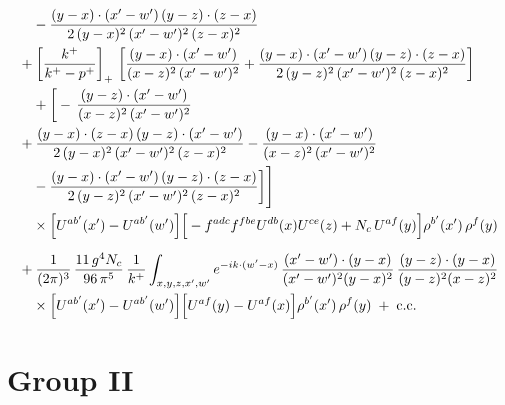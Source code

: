 \documentclass[9pt]{article}
\numberwithin{equation}{section}
\begin{document}
\begin{align}
&\quad -\frac{(y-x)\cdot (x^{\prime}-w^{\prime})\,(y-z)\cdot (z-x)}{2\,(y-x)^{2}\,(x^{\prime}-w^{\prime})^{2}\,(z-x)^{2}}\notag \\ & +\left[\frac{k^{+}}{k^{+}-p^{+}}\right]_{+}\,\left[\frac{(y-x)\cdot (x^{\prime}-w^{\prime})}{(x-z)^{2}\,(x^{\prime}-w^{\prime})^{2}}+\frac{(y-x)\cdot (x^{\prime}-w^{\prime})\,(y-z)\cdot (z-x)}{2\,(y-z)^{2}\,(x^{\prime}-w^{\prime})^{2}\,(z-x)^{2}}\right]\notag\\
&\quad +\bigg[-\,\frac{(y-z)\cdot (x^{\prime}-w^{\prime})}{(x-z)^{2}\,(x^{\prime}-w^{\prime})^{2}}\notag \\ & +\frac{(y-x)\cdot (z-x)\,(y-z)\cdot (x^{\prime}-w^{\prime})}{2\,(y-x)^{2}\,(x^{\prime}-w^{\prime})^{2}\,(z-x)^{2}}-\frac{(y-x)\cdot (x^{\prime}-w^{\prime})}{(x-z)^{2}\,(x^{\prime}-w^{\prime})^{2}}\notag\\
&\quad -\frac{(y-x)\cdot (x^{\prime}-w^{\prime})\,(y-z)\cdot (z-x)}{2\,(y-z)^{2}\,(x^{\prime}-w^{\prime})^{2}\,(z-x)^{2}}\bigg]\Bigg]\notag\\&\quad\times\Big[U^{ab^{\prime}}(x^{\prime})-U^{ab^{\prime}}(w^{\prime})\Big]\Big[-f^{adc}f^{fbe}U^{db}(x)U^{ce}(z)+N_{c}\,U^{af}(y)\Big]\rho^{b^{\prime}}(x^{\prime})\,\rho^{f}(y)\notag\\[6pt]&+\frac{1}{(2\pi)^{3}}\,\frac{11\,g^{4}N_{c}}{96\,\pi^{5}}\,\frac{1}{k^{+}}\int_{x,y,z,x^{\prime},w^{\prime}}e^{-ik\cdot(w^{\prime}-x)}\,\frac{(x^{\prime}-w^{\prime})\cdot(y-x)}{(x^{\prime}-w^{\prime})^{2}(y-x)^{2}}\,\frac{(y-z)\cdot(y-x)}{(y-z)^{2}(x-z)^{2}}\notag\\&\quad\times\Big[U^{ab^{\prime}}(x^{\prime})-U^{ab^{\prime}}(w^{\prime})\Big]\Big[U^{af}(y)-U^{af}(x)\Big]\rho^{b^{\prime}}(x^{\prime})\,\rho^{f}(y)\;+\;{\rm c.c.}
\end{align}
\section{Group II}
\end{document}

